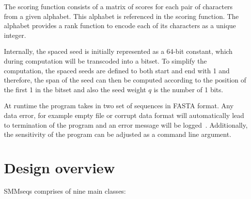 \documentclass[twoside,a4paper,bsc]{master}
\begin{document}
The scoring function consists of a matrix
of scores for each pair of characters from a given alphabet. This alphabet
is referenced in the scoring function. The alphabet provides a rank function
to encode each of its characters as a unique integer.

Internally, the spaced seed is initially represented as a 64-bit constant, which
during computation will be transcoded into a bitset. To simplify the
computation, the spaced seeds are defined to both start and end with 1 and
therefore, the span of the seed can then be computed
according to the position of the first {1 in} the bitset and also the seed
weight \(q\) is the number of 1 bits.

At runtime the program takes in two set of sequences in FASTA format.
Any data error, for example empty file or corrupt data format will
automatically lead to termination of the program and an error message will
be logged~\cite{gttl}. Additionally, the sensitivity of the program can be
adjusted as a command line argument.

\section{Design overview}

SMMseqs comprises of nine main classes:
\end{document}
